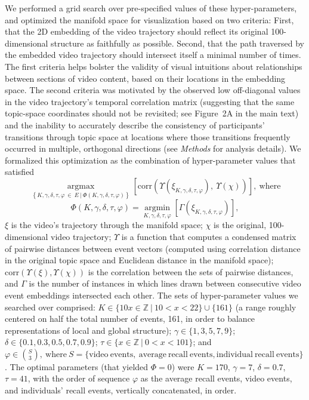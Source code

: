 \documentclass{article}
\newcommand{\argmax}{\mathop{\mathrm{argmax}}\limits}
\newcommand{\argmin}{\mathop{\mathrm{argmin}}\limits}
\begin{document}
We performed a grid search over pre-specified values of these hyper-parameters, and optimized the manifold space for visualization based on two criteria: First, that the 2D embedding of the video trajectory should reflect its original 100-dimensional structure as faithfully as possible. Second, that the path traversed by the embedded video trajectory should intersect itself a minimal number of times.  The first criteria helps bolster the validity of visual intuitions about relationships between sections of video content, based on their locations in the embedding space.  The second criteria was motivated by the observed low off-diagonal values in the video trajectory's temporal correlation matrix (suggesting that the same topic-space coordinates should not be revisited; see Figure~2A in the main text) and the inability to accurately describe the consistency of participants' transitions through topic space at locations where those transitions frequently occurred in multiple, orthogonal directions (see \textit{Methods} for analysis details).  We formalized this optimization as the combination of hyper-parameter values that satisfied
\[
\argmax_{\left\{K, \gamma, \delta, \tau, \varphi~\in~E~\mathrm{|}~\Phi\left(K, \gamma, \delta, \tau, \varphi \right) \right\}} \left[\mathrm{corr}\left(\Upsilon\left(\xi_{K, \gamma, \delta, \tau, \varphi}\right),~\Upsilon\left(\chi\right)\right)\right],~\mathrm{where}
\]
\[
\Phi\left(K, \gamma, \delta, \tau, \varphi \right) = \argmin_{K, \gamma, \delta, \tau, \varphi} \left[\Gamma\left(\xi_{K, \gamma, \delta, \tau, \varphi}\right)\right],
\]
$\xi$ is the video's trajectory through the manifold space; $\chi$ is the original, 100-dimensional video trajectory; $\Upsilon$ is a function that computes a condensed matrix of pairwise distances between event vectors (computed using correlation distance in the original topic space and Euclidean distance in the manifold space); $\mathrm{corr}\left(\Upsilon\left(\xi\right), \Upsilon\left(\chi\right)\right)$ is the correlation between the sets of pairwise distances, and $\Gamma$ is the number of instances in which lines drawn between consecutive video event embeddings intersected each other.   The sets of hyper-parameter values we searched over comprised: $K \in \{10x \in \mathbb{Z}~|~10 < x <  22\} \cup \{161\}$ (a range roughly centered on half the total number of events, 161, in order to balance representations of local and global structure); $\gamma \in \{1, 3, 5, 7, 9\}$; $\delta \in \{0.1, 0.3, 0.5, 0.7, 0.9\}$; $\tau \in \{x \in \mathbb{Z}~|~0 < x < 101\}$; and $\varphi \in {S\choose3},~\mathrm{where}~S=\{\mathrm{video~events,~average~recall~events, individual~recall~events}\}$.  The optimal parameters (that yielded $\Phi=0$) were $K=170$, $\gamma=7$, $\delta=0.7$, $\tau=41$, with the order of sequence $\varphi$ as the average recall events, video events, and individuals' recall events, vertically concatenated, in order.
\end{document}
